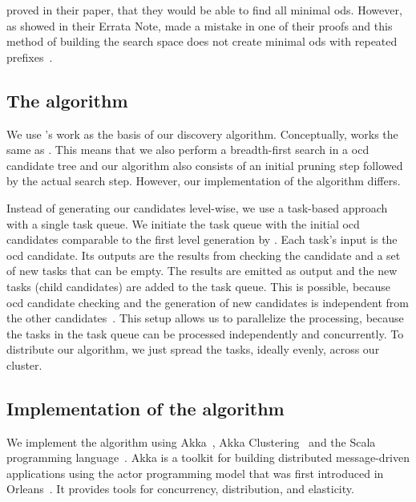    proved in their paper, that they would be able to find all minimal \glspl{od}.
  However, as \citeauthor{szlichta:errata} showed in their Errata Note, \citeauthor{consonni} made a mistake in one of their proofs and this method of building the search space does not create minimal \glspl{od} with repeated prefixes~\cite{szlichta:errata}.

\subsection{The \dodo{} algorithm}\label{sec:dodo}

  We use \citeauthor{consonni}'s work as the basis of our discovery algorithm.
  Conceptually, \dodo{} works the same as \ocddiscover{}.
  This means that we also perform a breadth-first search in a \gls{ocd} candidate tree and our algorithm also consists of an initial pruning step followed by the actual search step.
  However, our implementation of the algorithm differs.

  Instead of generating our candidates level-wise, we use a task-based approach with a single task queue.
  We initiate the task queue with the initial \gls{ocd} candidates comparable to the first level generation by \citeauthor{consonni}.
  Each task's input is the \gls{ocd} candidate.
  Its outputs are the results from checking the candidate and a set of new tasks that can be empty.
  The results are emitted as output and the new tasks (child candidates) are added to the task queue.
  This is possible, because \gls{ocd} candidate checking and the generation of new candidates is independent from the other candidates~\cite{consonni}.
  This setup allows us to parallelize the processing, because the tasks in the task queue can be processed independently and concurrently.
  To distribute our algorithm, we just spread the tasks, ideally evenly, across our cluster.

\subsection{Implementation of the \dodo{} algorithm}\label{sec:architecture}

  We implement the \dodo{} algorithm using Akka~\cite{akka}, Akka Clustering~\cite{akka:clustering} and the Scala programming language~\cite{scala}.
  Akka is a toolkit for building distributed message-driven applications using the actor programming model that was first introduced in Orleans~\cite{bernstein:orleans}.
  It provides tools for concurrency, distribution, and elasticity.

